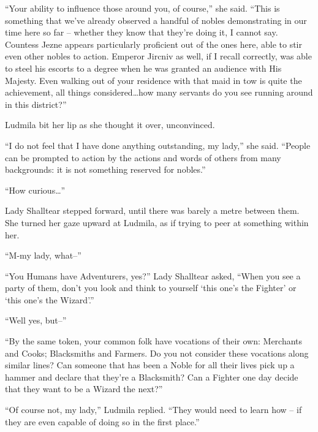  

“Your ability to influence those around you, of course,” she said. “This is something that we’ve already observed a handful of nobles demonstrating in our time here so far – whether they know that they’re doing it, I cannot say. Countess Jezne appears particularly proficient out of the ones here, able to stir even other nobles to action. Emperor Jircniv as well, if I recall correctly, was able to steel his escorts to a degree when he was granted an audience with His Majesty. Even walking out of your residence with that maid in tow is quite the achievement, all things considered…how many servants do you see running around in this district?”

 

Ludmila bit her lip as she thought it over, unconvinced.

 

“I do not feel that I have done anything outstanding, my lady,” she said. “People can be prompted to action by the actions and words of others from many backgrounds: it is not something reserved for nobles.”

 

“How curious…”

 

Lady Shalltear stepped forward, until there was barely a metre between them. She turned her gaze upward at Ludmila, as if trying to peer at something within her.

 

“M-my lady, what–”

 

“You Humans have Adventurers, yes?” Lady Shalltear asked, “When you see a party of them, don’t you look and think to yourself ‘this one’s the Fighter’ or ‘this one’s the Wizard’.”

 

“Well yes, but–”

 

“By the same token, your common folk have vocations of their own: Merchants and Cooks; Blacksmiths and Farmers. Do you not consider these vocations along similar lines? Can someone that has been a Noble for all their lives pick up a hammer and declare that they’re a Blacksmith? Can a Fighter one day decide that they want to be a Wizard the next?”

 

“Of course not, my lady,” Ludmila replied. “They would need to learn how – if they are even capable of doing so in the first place.”

